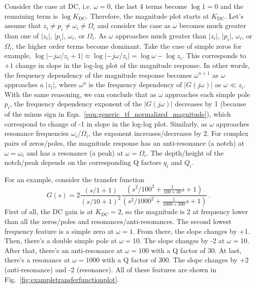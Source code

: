 Consider the case at DC, i.e. $\omega=0$, the last 4 terms become $\log 1 = 0$ and the remaining term is $\log K_{\mathrm{DC}}$.
Therefore, the magnitude plot starts at $K_\mathrm{DC}$.
Let's assume that $z_i\neq p_i \neq \omega_i \neq \Omega_i$ and consider the case as $\omega$ becomes much greater than one of $\lvert z_i\rvert$, $\lvert p_i\rvert$, $\omega_i$, or $\Omega_i$.
As $\omega$ approaches much greater than $\lvert z_i\rvert$, $\lvert p_i\rvert$, $\omega_i$, or $\Omega_i$, the higher order terms become dominant.
Take the case of simple zeros for example, $\log \left\lvert -j\omega/z_i+1\right\rvert\approx \log \lvert -j\omega/z_i \rvert = \log \omega - \log z_i$.
This corresponds to $+1$ change in slope in the log-log plot of the magnitude response.
In other words, the frequency dependency of the magnitude response becomes $\omega^{n+1}$ as $\omega$ approaches a $\lvert z_i\rvert$, where $\omega^n$ is the frequency dependency of $\lvert G(j\omega) \rvert$ as $\omega\ll z_i$.
With the same reasoning, we can conclude that as $\omega$ approaches each simple pole $p_i$, the frequency dependency exponent of the $\lvert G(j\omega)\rvert$ decreases by 1 (because of the minus sign in Eqn.~\eqref{eqn:generic_tf_normalized_magnitude}), which correspond to change of -1 in slope in the log-log plot.
Similarly, as $\omega$ approaches resonance frequencies $\omega_i$/$\Omega_i$, the exponent increases/decreases by 2.
For complex pairs of zeros/poles, the magnitude response has an anti-resonance (a notch) at $\omega=\omega_i$ and has a resonance (a peak) at $\omega=\Omega_i$.
The depth/height of the notch/peak depends on the corresponding Q factors $q_i$ and $Q_i$.

For an example, consider the transfer function
\begin{equation}
	G(s) = 2 \frac{(s/1 + 1)}{(s/10 + 1)^2}\frac{(s^2/100^2 + \frac{1}{100\times 30}s + 1)}{(s^2/1000^2 + \frac{1}{1000\times 300}s + 1)}\,.
	\label{eqn:example_transfer_function}
\end{equation}
First of all, the DC gain is at $K_\mathrm{DC}=2$, so the magnitude is 2 at frequency lower than all the zeros/poles and resonances/anti-resonances.
The second lowest frequency feature is a simple zero at $\omega=1$.
From there, the slope changes by +1.
Then, there's a double simple pole at $\omega=10$.
The slope changes by -2 at $\omega=10$.
After that, there's an anti-resonance at $\omega=100$ with a Q factor of 30.
At last, there's a resonance at $\omega=1000$ with a Q factor of 300.
The slope changes by +2 (anti-resonance) and -2 (resonance).
All of these features are shown in Fig.~\ref{fig:exampletransferfunctionplot}.

